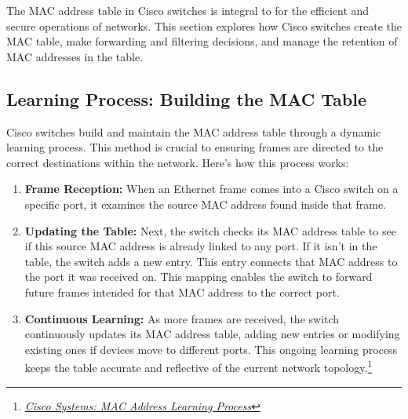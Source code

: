 \documentclass[11pt,a4paper]{article}
\begin{document}
The MAC address table in Cisco switches is integral to for the efficient and secure operations of networks. This section explores how Cisco switches create the MAC table, make forwarding and filtering decisions, and manage the retention of MAC addresses in the table.


\subsection*{Learning Process: Building the MAC Table}

Cisco switches build and maintain the MAC address table through a dynamic learning process. This method is crucial to ensuring frames are directed to the correct destinations within the network. Here’s how this process works:

\begin{enumerate}
    
    \item \textbf{Frame Reception:} When an Ethernet frame comes into a Cisco switch on a specific port, it examines the source MAC address found inside that frame.

    \item \textbf{Updating the Table:} Next, the switch checks its MAC address table to see if this source MAC address is already linked to any port. If it isn’t in the table, the switch adds a new entry. This entry connects that MAC address to the port it was received on. This mapping enables the switch to forward future frames intended for that MAC address to the correct port.

    \item \textbf{Continuous Learning:} As more frames are received, the switch continuously updates its MAC address table, adding new entries or modifying existing ones if devices move to different ports. This ongoing learning process keeps the table accurate and reflective of the current network topology.\footnote{\href{https://learningnetwork.cisco.com/s/article/mac-address-learing-pdf}{\textit{Cisco Systems: MAC Address Learning Process}}}

\end{enumerate}
\end{document}
